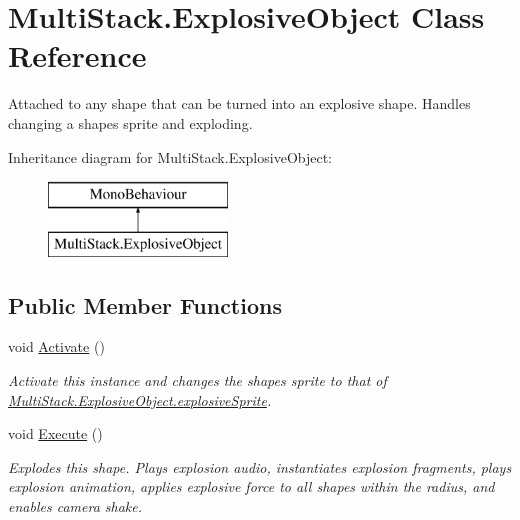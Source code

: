 \hypertarget{class_multi_stack_1_1_explosive_object}{}\section{Multi\+Stack.\+Explosive\+Object Class Reference}
\label{class_multi_stack_1_1_explosive_object}


Attached to any shape that can be turned into an explosive shape. Handles changing a shapes sprite and exploding.  


Inheritance diagram for Multi\+Stack.\+Explosive\+Object\+:\begin{figure}[H]
\begin{center}
\leavevmode
\includegraphics[height=2.000000cm]{class_multi_stack_1_1_explosive_object}
\end{center}
\end{figure}
\subsection*{Public Member Functions}
\begin{DoxyCompactItemize}
\item 
void \hyperlink{class_multi_stack_1_1_explosive_object_a370ff82a75c54370699bf2e6e9a5d3d3}{Activate} ()
\begin{DoxyCompactList}\small\item\em Activate this instance and changes the shapes sprite to that of \hyperlink{class_multi_stack_1_1_explosive_object_a837c3ceaac83c66cbb0b35de25a4821e}{Multi\+Stack.\+Explosive\+Object.\+explosive\+Sprite}. \end{DoxyCompactList}\item 
void \hyperlink{class_multi_stack_1_1_explosive_object_ae36d61db6bdd7744a6a662da354b00e8}{Execute} ()
\begin{DoxyCompactList}\small\item\em Explodes this shape. Plays explosion audio, instantiates explosion fragments, plays explosion animation, applies explosive force to all shapes within the radius, and enables camera shake. \end{DoxyCompactList}\end{DoxyCompactItemize}
